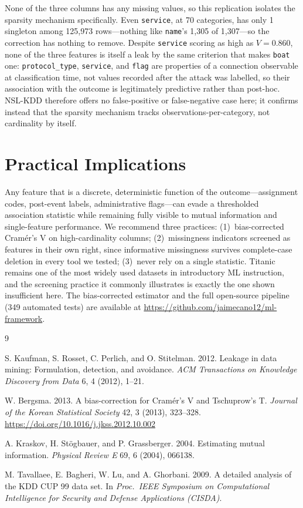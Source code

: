 \documentclass[sigconf,anonymous=false]{acmart}
\begin{document}
None of the three columns has any missing values, so this replication
isolates the sparsity mechanism specifically. Even \texttt{service}, at 70
categories, has only 1 singleton among 125{,}973 rows---nothing like
\texttt{name}'s 1{,}305 of 1{,}307---so the correction has nothing to
remove. Despite \texttt{service} scoring as high as $V{=}0.860$, none of
the three features is itself a leak by the same criterion that makes
\texttt{boat} one: \texttt{protocol\_type}, \texttt{service}, and
\texttt{flag} are properties of a connection observable at classification
time, not values recorded after the attack was labelled, so their
association with the outcome is legitimately predictive rather than
post-hoc. NSL-KDD therefore offers no false-positive or false-negative
case here; it confirms instead that the sparsity mechanism tracks
observations-per-category, not cardinality by itself.

\section{Practical Implications}

Any feature that is a discrete, deterministic function of the
outcome---assignment codes, post-event labels, administrative
flags---can evade a thresholded association statistic while remaining
fully visible to mutual information and single-feature performance. We
recommend three practices: (1)~bias-corrected Cram\'er's V on
high-cardinality columns; (2)~missingness indicators screened as features
in their own right, since informative missingness survives complete-case
deletion in every tool we tested; (3)~never rely on a single statistic.
Titanic remains one of the most widely used datasets in introductory ML
instruction, and the screening practice it commonly illustrates is exactly
the one shown insufficient here. The bias-corrected estimator and the
full open-source pipeline (349 automated tests) are available at
\url{https://github.com/jaimecano12/ml-framework}.


\begingroup
\small
\begin{thebibliography}{9}

S. Kaufman, S. Rosset, C. Perlich, and O. Stitelman.
2012.
Leakage in data mining: Formulation, detection, and avoidance.
\textit{ACM Transactions on Knowledge Discovery from Data} 6, 4 (2012), 1--21.

W. Bergsma.
2013.
A bias-correction for Cram\'er's V and Tschuprow's T.
\textit{Journal of the Korean Statistical Society} 42, 3 (2013), 323--328.
\url{https://doi.org/10.1016/j.jkss.2012.10.002}

A. Kraskov, H. St\"{o}gbauer, and P. Grassberger.
2004.
Estimating mutual information.
\textit{Physical Review E} 69, 6 (2004), 066138.

M. Tavallaee, E. Bagheri, W. Lu, and A. Ghorbani.
2009.
A detailed analysis of the KDD CUP 99 data set.
In \textit{Proc.\ IEEE Symposium on Computational Intelligence for Security and Defense Applications (CISDA)}.

\end{thebibliography}
\endgroup
\end{document}
